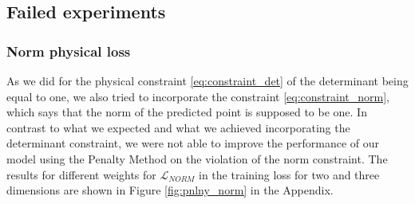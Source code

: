 
\subsection{Failed experiments}

\subsubsection{Norm physical loss}
As we did for the physical constraint \eqref{eq:constraint_det} of the determinant being equal to one, we also tried to incorporate the constraint \eqref{eq:constraint_norm}, which says that the norm of the predicted point is supposed to be one. In contrast to what we expected and what we achieved incorporating the determinant constraint, we were not able to improve the performance of our model using the Penalty Method on the violation of the norm constraint. The results for different weights for $\mathcal{L}_{NORM}$ in the training loss for two and three dimensions are shown in Figure \ref{fig:pnlny_norm} in the Appendix.

